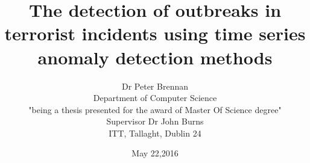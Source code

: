 \documentclass[options]{report}
\begin{document}

\title{The detection of outbreaks in terrorist incidents using time series anomaly detection methods}
\author{Dr Peter Brennan\\Department of Computer Science\\"being a thesis presented for the award of Master Of Science degree"\\Supervisor Dr John Burns\\ITT, Tallaght, Dublin 24}
\date{May 22,2016}




\maketitle
{}





\tableofcontents
\listoffigures
\listoftables

%
%
%
%
%
\end{document}
